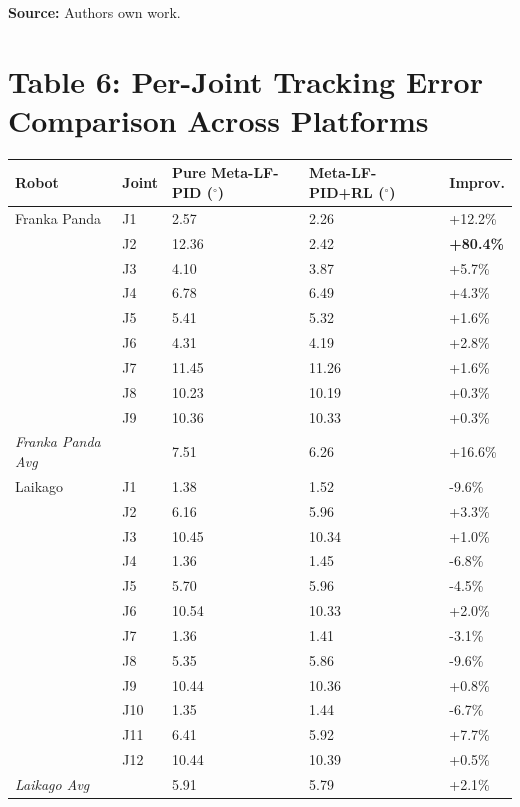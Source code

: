 \documentclass[11pt,a4paper]{article}
\begin{document}
\vspace{0.2cm}
\noindent
\textbf{Source:} Authors own work.


\section*{Table 6: Per-Joint Tracking Error Comparison Across Platforms}

\begin{tabular}{@{\extracolsep{\fill}}lllll}
\hline
\textbf{Robot} & \textbf{Joint} & \textbf{Pure Meta-LF-PID ($^\circ$)} & \textbf{Meta-LF-PID+RL ($^\circ$)} & \textbf{Improv.} \\
\hline
Franka Panda    & J1     &   2.57 &   2.26 & +12.2\% \\
                & J2     &  12.36 &   2.42 & \textbf{+80.4\%} \\
                & J3     &   4.10 &   3.87 &  +5.7\% \\
                & J4     &   6.78 &   6.49 &  +4.3\% \\
                & J5     &   5.41 &   5.32 &  +1.6\% \\
                & J6     &   4.31 &   4.19 &  +2.8\% \\
                & J7     &  11.45 &  11.26 &  +1.6\% \\
                & J8     &  10.23 &  10.19 &  +0.3\% \\
                & J9     &  10.36 &  10.33 &  +0.3\% \\
\hline
\textit{Franka Panda Avg} & &   7.51 &   6.26 & +16.6\% \\
\hline
Laikago         & J1     &   1.38 &   1.52 &  -9.6\% \\
                & J2     &   6.16 &   5.96 &  +3.3\% \\
                & J3     &  10.45 &  10.34 &  +1.0\% \\
                & J4     &   1.36 &   1.45 &  -6.8\% \\
                & J5     &   5.70 &   5.96 &  -4.5\% \\
                & J6     &  10.54 &  10.33 &  +2.0\% \\
                & J7     &   1.36 &   1.41 &  -3.1\% \\
                & J8     &   5.35 &   5.86 &  -9.6\% \\
                & J9     &  10.44 &  10.36 &  +0.8\% \\
                & J10    &   1.35 &   1.44 &  -6.7\% \\
                & J11    &   6.41 &   5.92 &  +7.7\% \\
                & J12    &  10.44 &  10.39 &  +0.5\% \\
\hline
\textit{Laikago Avg} & &   5.91 &   5.79 &  +2.1\% \\
\hline
\end{tabular}
\end{document}

